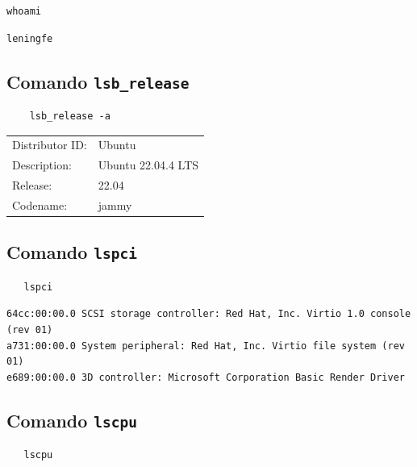 \documentclass{article}
\begin{document}
\begin{verbatim}
whoami
\end{verbatim}

\begin{verbatim}
leningfe
\end{verbatim}

\subsection{Comando \texttt{lsb\_release}}
\label{sec:org36af823}
\begin{verbatim}
    lsb_release -a
\end{verbatim}

\begin{center}
\begin{tabular}{ll}
Distributor ID: & Ubuntu\\[0pt]
Description: & Ubuntu 22.04.4 LTS\\[0pt]
Release: & 22.04\\[0pt]
Codename: & jammy\\[0pt]
\end{tabular}
\end{center}


\subsection{Comando \texttt{lspci}}
\label{sec:org9192909}
\begin{verbatim}
   lspci
\end{verbatim}

\begin{verbatim}
64cc:00:00.0 SCSI storage controller: Red Hat, Inc. Virtio 1.0 console (rev 01)
a731:00:00.0 System peripheral: Red Hat, Inc. Virtio file system (rev 01)
e689:00:00.0 3D controller: Microsoft Corporation Basic Render Driver
\end{verbatim}


\subsection{Comando \texttt{lscpu}}
\label{sec:org7ee376f}
\begin{verbatim}
   lscpu
\end{verbatim}
\end{document}
